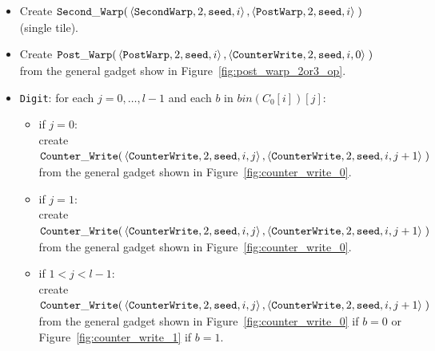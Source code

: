 \begin{itemize}
    \item Create
    $\begin{aligned}[t]
        {\tt Second\_Warp}(&\left\langle {\tt SecondWarp}, 2, {\tt seed}, i \right\rangle,
                     \left\langle {\tt PostWarp},   2, {\tt seed}, i \right\rangle \;)
    \end{aligned}$ (single tile).

    \item Create
    $\begin{aligned}[t]
        {\tt Post\_Warp}(&\left\langle {\tt PostWarp}, 2, {\tt seed}, i    \right\rangle,
                   \left\langle {\tt CounterWrite},    2, {\tt seed}, i, 0 \right\rangle \;)
    \end{aligned}$\\ from the general gadget show in Figure~\ref{fig:post_warp_2or3_op}.

    \item {\tt Digit}: for each $j=0,\ldots,l-1$ and each $b$ in $bin(C_0[i])[j]$:
    \begin{itemize}
        \item if $j = 0$:\\ create
        $\begin{aligned}[t]
            {\tt Counter\_Write}(&\left\langle {\tt CounterWrite}, 2, {\tt seed}, i, j \right\rangle, \left\langle {\tt CounterWrite}, 2, {\tt seed}, i, j + 1 \right\rangle \;)
        \end{aligned}$\\from the general gadget shown in Figure~\ref{fig:counter_write_0}.

        \item if $j = 1$:\\ create
        $\begin{aligned}[t]
            {\tt Counter\_Write}(&\left\langle {\tt CounterWrite}, 2, {\tt seed}, i, j \right\rangle, \left\langle {\tt CounterWrite}, 2, {\tt seed}, i, j + 1 \right\rangle \;)
        \end{aligned}$\\from the general gadget shown in Figure~\ref{fig:counter_write_0}.

        \item if $1 < j < l-1$:\\ create
        $\begin{aligned}[t]
            {\tt Counter\_Write}(&\left\langle {\tt CounterWrite}, 2, {\tt seed}, i, j \right\rangle, \left\langle {\tt CounterWrite}, 2, {\tt seed}, i, j + 1 \right\rangle \;)
        \end{aligned}$\\from the general gadget shown in Figure~\ref{fig:counter_write_0} if $b = 0$ or Figure~\ref{fig:counter_write_1} if $b = 1$.


\end{itemize}
\end{itemize}
